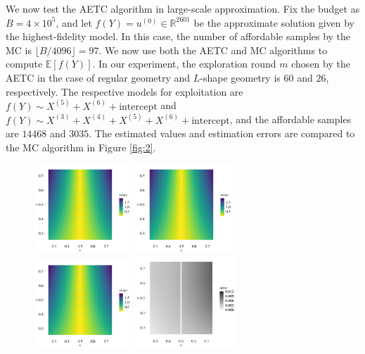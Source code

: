 \documentclass[a4paper,11pt]{article}
\numberwithin{equation}{section}
\theoremstyle{plain}
\theoremstyle{definition}
\def\R{{\mathbb R}}
\def\E{{\mathbb E}}
\def\R{{\mathbb R}}
\begin{document}
We now test the AETC algorithm in large-scale approximation. 
Fix the budget as $B = 4\times 10^5$, and let $f(Y) = u^{(0)}\in\R^{2601}$ be the approximate solution given by the highest-fidelity model.  
In this case, the number of affordable samples by the MC is $\lfloor B/4096\rfloor = 97$. 
We now use both the AETC and MC algorithms to compute $\E[f(Y)]$. 
In our experiment, the exploration round $m$ chosen by the AETC in the case of regular geometry and $L$-shape geometry is $60$ and $26$, respectively.
The respective models for exploitation are $f(Y)\sim X^{(5)}+X^{(6)}+\text{intercept}$ and $f(Y)\sim X^{(3)}+X^{(4)}+X^{(5)}+X^{(6)}+\text{intercept}$, and the affordable samples are $14468$ and $3035$. The estimated values and estimation errors are compared to the MC algorithm in Figure \ref{fig:2}. 
\begin{figure}[h!]
\begin{center}
  \includegraphics[width=0.328\textwidth]{r.pdf}
  \includegraphics[width=0.328\textwidth]{r_mc.pdf}
   \includegraphics[width=0.328\textwidth]{r_lrmc.pdf}
     \includegraphics[width=0.34\textwidth]{error_mc.pdf}\ \ \ \ \

\end{center}
\end{figure}
\end{document}
